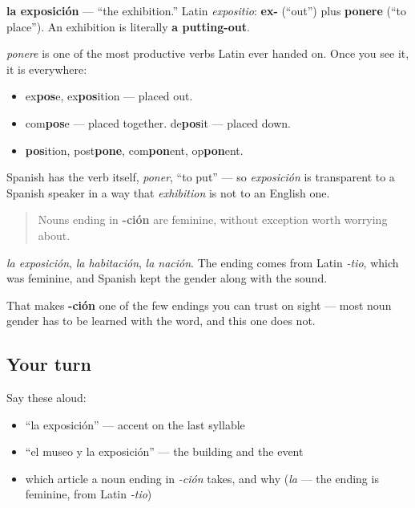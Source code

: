 \begin{cousinweb}
\textbf{la exposición} — \textquotedblleft{}the exhibition.\textquotedblright{} Latin \emph{expositio}: \textbf{ex-} (\textquotedblleft{}out\textquotedblright{}) plus \textbf{ponere} (\textquotedblleft{}to place\textquotedblright{}). An exhibition is literally \textbf{a putting-out}.

\emph{ponere} is one of the most productive verbs Latin ever handed on. Once you see it, it is everywhere:

\begin{itemize}
\raggedright
  \item ex\textbf{pos}e, ex\textbf{pos}ition — placed out.
  \item com\textbf{pos}e — placed together. de\textbf{pos}it — placed down.
  \item \textbf{pos}ition, post\textbf{pone}, com\textbf{pon}ent, op\textbf{pon}ent.
\end{itemize}

Spanish has the verb itself, \emph{poner}, \textquotedblleft{}to put\textquotedblright{} — so \emph{exposición} is transparent to a Spanish speaker in a way that \emph{exhibition} is not to an English one.
\end{cousinweb}

\begin{grammarlens}[title={Grammar Lens: the ending that tells you the gender}]
\begin{quote}
Nouns ending in \textbf{-ción} are feminine, without exception worth worrying about.
\end{quote}

\emph{la exposición}, \emph{la habitación}, \emph{la nación}. The ending comes from Latin \emph{-tio}, which was feminine, and Spanish kept the gender along with the sound.

That makes \textbf{-ción} one of the few endings you can trust on sight — most noun gender has to be learned with the word, and this one does not.
\end{grammarlens}

\subsection*{Your turn}
Say these aloud:

\begin{itemize}
\raggedright
  \item \textquotedblleft{}la exposición\textquotedblright{} — accent on the last syllable
  \item \textquotedblleft{}el museo y la exposición\textquotedblright{} — the building and the event
  \item which article a noun ending in \emph{-ción} takes, and why (\emph{la} — the ending is feminine, from Latin \emph{-tio})
\end{itemize}

